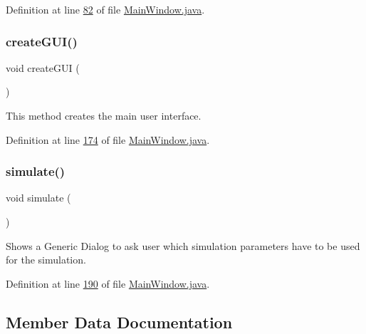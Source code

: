 Definition at line \hyperlink{_main_window_8java_source_l00082}{82} of file \hyperlink{_main_window_8java_source}{Main\+Window.\+java}.

\hypertarget{classgui_1_1_main_window_ae3700d532c2ae5e2171016e13584b2d6}{}\label{classgui_1_1_main_window_ae3700d532c2ae5e2171016e13584b2d6} 
\subsubsection{\texorpdfstring{create\+G\+U\+I()}{createGUI()}}
{\footnotesize\ttfamily void create\+G\+UI (\begin{DoxyParamCaption}{ }\end{DoxyParamCaption})\hspace{0.3cm}{\ttfamily [private]}}



This method creates the main user interface. 



Definition at line \hyperlink{_main_window_8java_source_l00174}{174} of file \hyperlink{_main_window_8java_source}{Main\+Window.\+java}.

\hypertarget{classgui_1_1_main_window_a1f451daf160cbacfab1e7b495789750e}{}\label{classgui_1_1_main_window_a1f451daf160cbacfab1e7b495789750e} 
\subsubsection{\texorpdfstring{simulate()}{simulate()}}
{\footnotesize\ttfamily void simulate (\begin{DoxyParamCaption}{ }\end{DoxyParamCaption})\hspace{0.3cm}{\ttfamily [private]}}



Shows a Generic Dialog to ask user which simulation parameters have to be used for the simulation. 



Definition at line \hyperlink{_main_window_8java_source_l00190}{190} of file \hyperlink{_main_window_8java_source}{Main\+Window.\+java}.



\subsection{Member Data Documentation}
\hypertarget{classgui_1_1_main_window_aab2220fd8a9f6468b0b5e9f1ddf28729}{}\label{classgui_1_1_main_window_aab2220fd8a9f6468b0b5e9f1ddf28729} 
